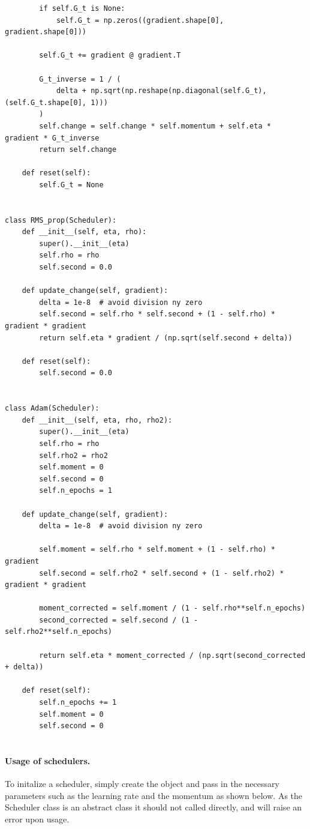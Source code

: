 \documentclass[%
oneside,                 %
final,                   %
10pt]{article}
\begin{document}
\begin{verbatim}
        if self.G_t is None:
            self.G_t = np.zeros((gradient.shape[0], gradient.shape[0]))

        self.G_t += gradient @ gradient.T

        G_t_inverse = 1 / (
            delta + np.sqrt(np.reshape(np.diagonal(self.G_t), (self.G_t.shape[0], 1)))
        )
        self.change = self.change * self.momentum + self.eta * gradient * G_t_inverse
        return self.change

    def reset(self):
        self.G_t = None


class RMS_prop(Scheduler):
    def __init__(self, eta, rho):
        super().__init__(eta)
        self.rho = rho
        self.second = 0.0

    def update_change(self, gradient):
        delta = 1e-8  # avoid division ny zero
        self.second = self.rho * self.second + (1 - self.rho) * gradient * gradient
        return self.eta * gradient / (np.sqrt(self.second + delta))

    def reset(self):
        self.second = 0.0


class Adam(Scheduler):
    def __init__(self, eta, rho, rho2):
        super().__init__(eta)
        self.rho = rho
        self.rho2 = rho2
        self.moment = 0
        self.second = 0
        self.n_epochs = 1

    def update_change(self, gradient):
        delta = 1e-8  # avoid division ny zero

        self.moment = self.rho * self.moment + (1 - self.rho) * gradient
        self.second = self.rho2 * self.second + (1 - self.rho2) * gradient * gradient

        moment_corrected = self.moment / (1 - self.rho**self.n_epochs)
        second_corrected = self.second / (1 - self.rho2**self.n_epochs)

        return self.eta * moment_corrected / (np.sqrt(second_corrected + delta))

    def reset(self):
        self.n_epochs += 1
        self.moment = 0
        self.second = 0


\end{verbatim}


\paragraph{Usage of schedulers.}
To initalize a scheduler, simply create the object and pass in the necessary parameters such as the learning rate and the momentum as shown below. As the Scheduler class is an abstract class it should not called directly, and will raise an error upon usage.
\end{document}
